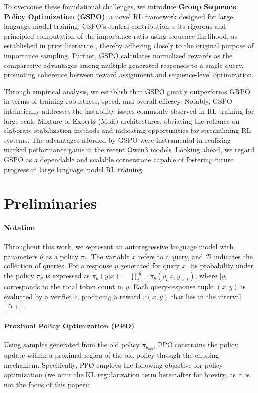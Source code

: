 To overcome these foundational challenges, we introduce \textbf{Group Sequence Policy Optimization (GSPO)}, a novel RL framework designed for large language model training. GSPO’s central contribution is its rigorous and principled computation of the importance ratio using sequence likelihood, as established in prior literature \citep{click}, thereby adhering closely to the original purpose of importance sampling. Further, GSPO calculates normalized rewards as the comparative advantages among multiple generated responses to a single query, promoting coherence between reward assignment and sequence-level optimization.

Through empirical analysis, we establish that GSPO greatly outperforms GRPO in terms of training robustness, speed, and overall efficacy. Notably, GSPO intrinsically addresses the instability issues commonly observed in RL training for large-scale Mixture-of-Experts (MoE) architectures, obviating the reliance on elaborate stabilization methods and indicating opportunities for streamlining RL systems. The advantages afforded by GSPO were instrumental in realizing marked performance gains in the recent Qwen3 models. Looking ahead, we regard GSPO as a dependable and scalable cornerstone capable of fostering future progress in large language model RL training.

\section{Preliminaries}

\paragraph{Notation}
Throughout this work, we represent an autoregressive language model with parameters $\theta$ as a policy $\pi_\theta$. The variable $x$ refers to a query, and $\mathcal{D}$ indicates the collection of queries. For a response $y$ generated for query $x$, its probability under the policy $\pi_\theta$ is expressed as $\pi_\theta (y | x)=\prod_{t=1}^{|y|} \pi_\theta (y_t | x, y_{<t} )$, where $|y|$ corresponds to the total token count in $y$. Each query-response tuple $(x, y)$ is evaluated by a verifier $r$, producing a reward $r(x, y)$ that lies in the interval $[ 0, 1 ]$.

\paragraph{Proximal Policy Optimization (PPO)} Using samples generated from the old policy $\pi_{\theta_\text{old}}$, PPO \citep{ppo} constrains the policy update within a proximal region of the old policy through the clipping mechanism. Specifically, PPO employs the following objective for policy optimization (we omit the KL regularization term hereinafter for brevity, as it is not the focus of this paper):

